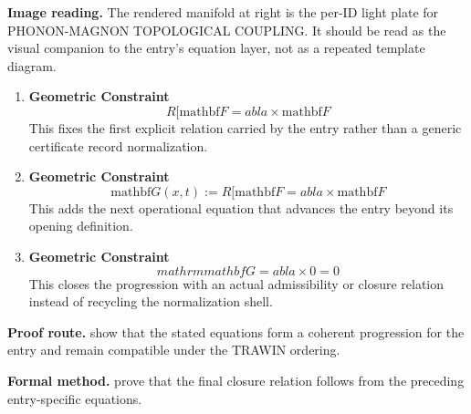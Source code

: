 \begin{samepage}
\noindent\begin{minipage}[t]{0.45\linewidth}
\vspace{0pt}
\raggedright
\scriptsize\textbf{Image reading.} The rendered manifold at right is the per-ID light plate for PHONON-MAGNON TOPOLOGICAL COUPLING. It should be read as the visual companion to the entry's equation layer, not as a repeated template diagram.\par
\end{minipage}\hfill
\begin{minipage}[t]{0.53\linewidth}
\vspace*{-0.10in}
\raggedright
{}
\end{minipage}
\end{samepage}

\clearpage


\begin{enumerate}[leftmargin=1.6em,itemsep=9pt,topsep=6pt]
\item \textbf{Geometric Constraint}
\[
R[\mathrm{mathbf}{F} =  abla\times \mathrm{mathbf}{F}
\]
This fixes the first explicit relation carried by the entry rather than a generic certificate record normalization.

\item \textbf{Geometric Constraint}
\[
\mathrm{mathbf}{G}(x,t) := R[\mathrm{mathbf}{F} =  abla\times \mathrm{mathbf}{F}
\]
This adds the next operational equation that advances the entry beyond its opening definition.

\item \textbf{Geometric Constraint}
\[
mathrm{mathbf}{G} =  abla\times 0 = 0
\]
This closes the progression with an actual admissibility or closure relation instead of recycling the normalization shell.
\end{enumerate}

\textbf{Proof route.} show that the stated equations form a coherent progression for the entry and remain compatible under the TRAWIN ordering.

\textbf{Formal method.} prove that the final closure relation follows from the preceding entry-specific equations.

\medskip
{}

